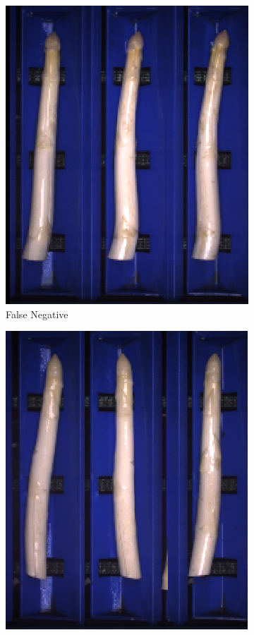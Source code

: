 \begin{figure}[h]
	\centering
	\begin{subfigure}{0.3\textwidth}
		\includegraphics[width=0.9\linewidth]{Figures/appendix/thick_falsenegative_01.png}
		\vspace{-5pt} 
		\caption{False Negative}
	\end{subfigure}
	\begin{subfigure}{0.3\textwidth}
		\includegraphics[width=0.9\linewidth]{Figures/appendix/thick_falsenegative_02.png}

\end{subfigure}
\end{figure}
